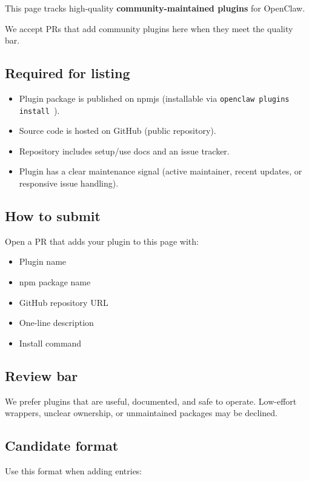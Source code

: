 This page tracks high-quality \textbf{community-maintained plugins} for OpenClaw.

We accept PRs that add community plugins here when they meet the quality bar.

\subsection{Required for listing}


\begin{itemize}
  \item Plugin package is published on npmjs (installable via \texttt{openclaw plugins install }).
  \item Source code is hosted on GitHub (public repository).
  \item Repository includes setup/use docs and an issue tracker.
  \item Plugin has a clear maintenance signal (active maintainer, recent updates, or responsive issue handling).
\end{itemize}


\subsection{How to submit}


Open a PR that adds your plugin to this page with:

\begin{itemize}
  \item Plugin name
  \item npm package name
  \item GitHub repository URL
  \item One-line description
  \item Install command
\end{itemize}


\subsection{Review bar}


We prefer plugins that are useful, documented, and safe to operate.
Low-effort wrappers, unclear ownership, or unmaintained packages may be declined.

\subsection{Candidate format}


Use this format when adding entries:

